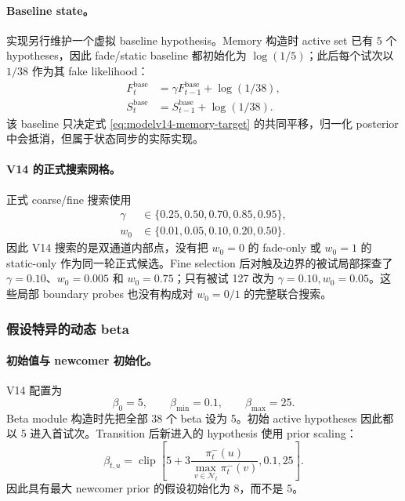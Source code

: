 \paragraph{Baseline state。}
实现另行维护一个虚拟 baseline hypothesis。Memory 构造时 active set 已有 5 个 hypotheses，因此 fade/static baseline 都初始化为 $\log(1/5)$；此后每个试次以 $1/38$ 作为其 fake likelihood：
\begin{align}
    F_t^{\mathrm{base}}
    &=
    \gamma F_{t-1}^{\mathrm{base}}+\log(1/38),\\
    S_t^{\mathrm{base}}
    &=
    S_{t-1}^{\mathrm{base}}+\log(1/38).
    \label{eq:modelv14-memory-baseline}
\end{align}
该 baseline 只决定式 \ref{eq:modelv14-memory-target} 的共同平移，归一化 posterior 中会抵消，但属于状态同步的实际实现。

\paragraph{V14 的正式搜索网格。}
正式 coarse/fine 搜索使用
\begin{align}
    \gamma
    &\in\{0.25,0.50,0.70,0.85,0.95\},\\
    w_0
    &\in\{0.01,0.05,0.10,0.20,0.50\}.
    \label{eq:modelv14-memory-grid}
\end{align}
因此 V14 搜索的是双通道内部点，没有把 $w_0=0$ 的 fade-only 或 $w_0=1$ 的 static-only 作为同一轮正式候选。Fine selection 后对触及边界的被试局部探查了 $\gamma=0.10$、$w_0=0.005$ 和 $w_0=0.75$；只有被试 127 改为 $\gamma=0.10,w_0=0.05$。这些局部 boundary probes 也没有构成对 $w_0=0/1$ 的完整联合搜索。


\subsubsection{假设特异的动态 beta}

\paragraph{初始值与 newcomer 初始化。}
V14 配置为
\begin{equation}
    \beta_0=5,\qquad
    \beta_{\min}=0.1,\qquad
    \beta_{\max}=25.
    \label{eq:modelv14-beta-constants}
\end{equation}
Beta module 构造时先把全部 38 个 beta 设为 5。初始 active hypotheses 因此都以 5 进入首试次。Transition 后新进入的 hypothesis 使用 prior scaling：
\begin{equation}
    \beta_{t,u}
    =
    \operatorname{clip}
    \left[
        5+
        3
        \frac{
            \pi_t^-(u)
        }{
            \max_{v\in\mathcal N_t}\pi_t^-(v)
        },
        0.1,25
    \right].
    \label{eq:modelv14-beta-newcomer}
\end{equation}
因此具有最大 newcomer prior 的假设初始化为 8，而不是 5。

